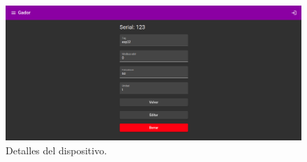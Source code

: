 \begin{figure}[h]
	\centering
	\includegraphics[width=\textwidth]{./Figures/DeviceDetails.png}
	\caption{Detalles del dispositivo.}
	\label{fig:ch3FrontendImg3}
\end{figure}